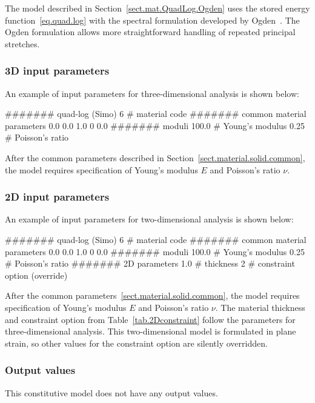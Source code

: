 The model described in
Section~\ref{sect.mat.QuadLog.Ogden} uses the stored energy 
function~\eqref{eq.quad.log} with the spectral
formulation developed by Ogden~\cite{Ogden1983}. The Ogden formulation 
allows more straightforward handling of repeated principal stretches.

\subsubsection{3D input parameters}
An example of input parameters for three-dimensional analysis is shown 
below:
\begin{inputfile}
####### quad-log (Simo)
6     # material code
####### common material parameters
0.0    0.0    1.0
0      0.0
####### moduli
100.0 # Young's modulus
0.25  # Poisson's ratio
\end{inputfile}
After the common parameters described in 
Section~\ref{sect.material.solid.common}, the 
model requires specification of Young's modulus 
$E$ and Poisson's ratio $\nu$.

\subsubsection{2D input parameters}
An example of input parameters for two-dimensional analysis is shown 
below:
\begin{inputfile}
####### quad-log (Simo)
6     # material code
####### common material parameters
0.0    0.0    1.0
0      0.0
####### moduli
100.0 # Young's modulus
0.25  # Poisson's ratio
####### 2D parameters
1.0   # thickness
2     # constraint option (override)
\end{inputfile}
After the common parameters~\ref{sect.material.solid.common}, the 
model requires specification of Young's modulus $E$ and Poisson's 
ratio $\nu$. The material thickness and 
constraint option from Table~\ref{tab.2Dconstraint} 
follow the parameters for three-dimensional analysis.
This two-dimensional model is formulated in plane strain,
so other values for the constraint option are silently
overridden.

\subsubsection{Output values}
This constitutive model does not have any output values.

